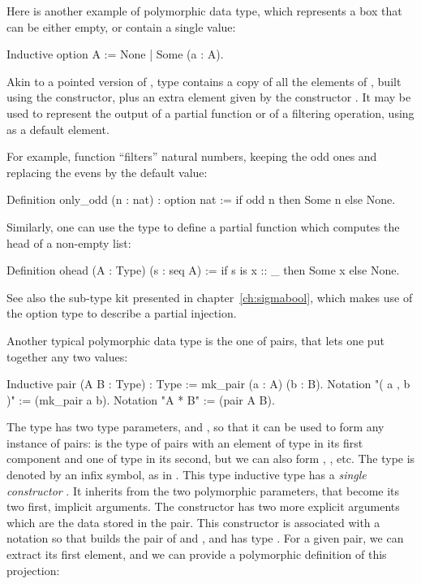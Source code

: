 Here is another example of polymorphic data type, which represents a
box that can be either empty, or contain a single value:

\begin{coq}{}{}
Inductive option A := None | Some (a : A).
\end{coq}

Akin to a pointed version of , type   contains a
copy of all the elements of ,
built using the  constructor, plus an extra element given by
the constructor . It may be used to represent the output of a
partial function or of a filtering operation, using  as a
default element.

For example, function  ``filters'' natural numbers, keeping the
odd ones and replacing the evens by the  default value:

\begin{coq}{}{}
Definition only_odd (n : nat) : option nat :=
  if odd n then Some n else None.
\end{coq}

Similarly, one can use the  type to define a partial function
which computes the head of a non-empty list:

\begin{coq}{}{}
Definition ohead (A : Type) (s : seq A) :=
  if s is x :: _ then Some x else None.
\end{coq}

See also the sub-type kit presented in chapter~\ref{ch:sigmabool},
which makes use of the option type to describe a partial injection.

Another typical polymorphic data type is the one of pairs, that
lets one put together any two values:
\index[coq]{\C{(_ , _)}}

\begin{coq}{}{}
Inductive pair (A B : Type) : Type := mk_pair (a : A) (b : B).
Notation "( a , b )" := (mk_pair a b).
Notation "A * B" := (pair A B).
\end{coq}

The type  has two type parameters,  and
, so
that it can be used to form any instance of pairs: 
is the type of pairs with an element of type  in its first
component and one of type  in its second, but we can also form
, , etc. The type  is
denoted by an infix \C{*} symbol, as in .
This type inductive type has
a \emph{single constructor} . It inherits from the two
polymorphic parameters, that become its two first, implicit arguments.
The constructor  has two more explicit arguments which are
the data stored in the pair. This constructor is associated with
a notation so that  builds the pair of  and , and
 has type . For a given pair, we can
extract its first element, and we can provide a polymorphic definition
of this projection:

